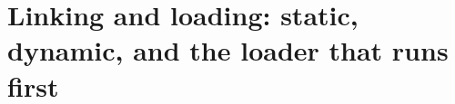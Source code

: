 \chapter{Linking and loading: static, dynamic, and the loader that runs first}
\label{ch:linking-and-loading-static-dynamic-and}

